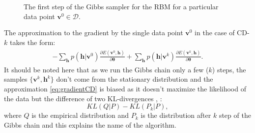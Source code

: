 \begin{figure}[!htb]
\begin{center}
\end{center}
  \caption[Illustration of Gibbs sampling]{The first step of the Gibbs sampler for the RBM for a particular data point $\mathbf{v}^0 \in \mathcal{D}$.}
  \label{fig:gibbsSampling}
\end{figure}

The approximation to the gradient by the single data point $\mathbf{v}^0$ in the case of CD-$k$ takes the form:
\begin{align}
\begin{split}
- \sum_\mathbf{h} p(\mathbf{h} | \mathbf{v}^0) \frac{\partial E(\mathbf{v}^0, \mathbf{h})}{\partial \mathbf{\theta}} +  \sum_{\mathbf{h}} p(\mathbf{h} | \mathbf{v}^k) \frac{\partial E(\mathbf{v}^k,\mathbf{h})}{\partial \mathbf{\theta}}.
\end{split}
\label{eq:gradientCD}
\end{align}
It should be noted here that as we run the Gibbs chain only a few ($k$) steps, the samples $\{\mathbf{v}^k, \mathbf{h}^k\}$ don't come from the stationary distribution and the approximation \ref{eq:gradientCD} is biased as it doesn't maximize the likelihood of the data but the difference of two KL-divergences \cite{hinton2002training}, \cite{fischer2012introduction}:
$$KL(Q | P) - KL (P_k| P),$$
where $Q$ is the empirical distribution and $P_k$ is the distribution after $k$ step of the Gibbs chain and this explains the name of the algorithm.
